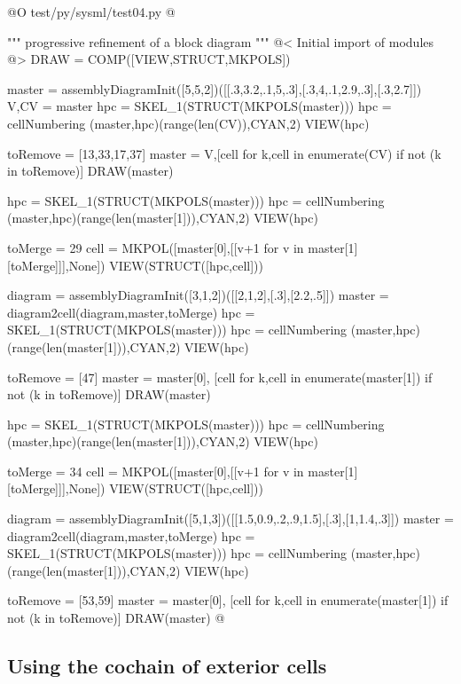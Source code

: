 \documentclass[11pt,oneside]{article}	%
\begin{document}
@O test/py/sysml/test04.py
@{""" progressive refinement of a block diagram """
@< Initial import of modules @>
DRAW = COMP([VIEW,STRUCT,MKPOLS])

master = assemblyDiagramInit([5,5,2])([[.3,3.2,.1,5,.3],[.3,4,.1,2.9,.3],[.3,2.7]])
V,CV = master
hpc = SKEL_1(STRUCT(MKPOLS(master)))
hpc = cellNumbering (master,hpc)(range(len(CV)),CYAN,2)
VIEW(hpc)

toRemove = [13,33,17,37]
master = V,[cell for k,cell in enumerate(CV) if not (k in toRemove)]
DRAW(master)

hpc = SKEL_1(STRUCT(MKPOLS(master)))
hpc = cellNumbering (master,hpc)(range(len(master[1])),CYAN,2)
VIEW(hpc)

toMerge = 29
cell = MKPOL([master[0],[[v+1 for v in  master[1][toMerge]]],None])
VIEW(STRUCT([hpc,cell]))

diagram = assemblyDiagramInit([3,1,2])([[2,1,2],[.3],[2.2,.5]])
master = diagram2cell(diagram,master,toMerge)
hpc = SKEL_1(STRUCT(MKPOLS(master)))
hpc = cellNumbering (master,hpc)(range(len(master[1])),CYAN,2)
VIEW(hpc)

toRemove = [47]
master = master[0], [cell for k,cell in enumerate(master[1]) if not (k in toRemove)]
DRAW(master)

hpc = SKEL_1(STRUCT(MKPOLS(master)))
hpc = cellNumbering (master,hpc)(range(len(master[1])),CYAN,2)
VIEW(hpc)

toMerge = 34
cell = MKPOL([master[0],[[v+1 for v in  master[1][toMerge]]],None])
VIEW(STRUCT([hpc,cell]))

diagram = assemblyDiagramInit([5,1,3])([[1.5,0.9,.2,.9,1.5],[.3],[1,1.4,.3]])
master = diagram2cell(diagram,master,toMerge)
hpc = SKEL_1(STRUCT(MKPOLS(master)))
hpc = cellNumbering (master,hpc)(range(len(master[1])),CYAN,2)
VIEW(hpc)

toRemove = [53,59]
master = master[0], [cell for k,cell in enumerate(master[1]) if not (k in toRemove)]
DRAW(master)
@}

\subsection{Using the cochain of exterior cells}
\label{sec:exterior}
\end{document}
